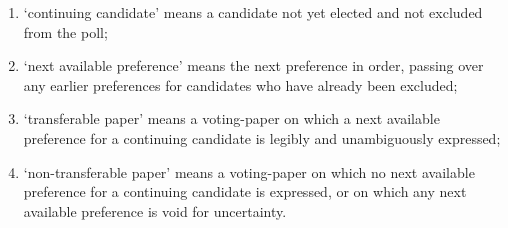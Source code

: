 \documentclass{article}
\begin{document}
\begin{enumerate}
\begin{enumerate}
  \item `continuing candidate' means a candidate not yet elected and not
  excluded from the poll;
  \item `next available preference' means the next preference in order, passing
  over any earlier preferences for candidates who have already been
  excluded;
  \item `transferable paper' means a voting-paper on which a next available
  preference for a continuing candidate is legibly and unambiguously
  expressed;
  \item `non-transferable paper' means a voting-paper on which no next available preference for a continuing candidate is expressed, or on which
  any next available preference is void for uncertainty.
  \end{enumerate}
\end{enumerate}
\end{document}
